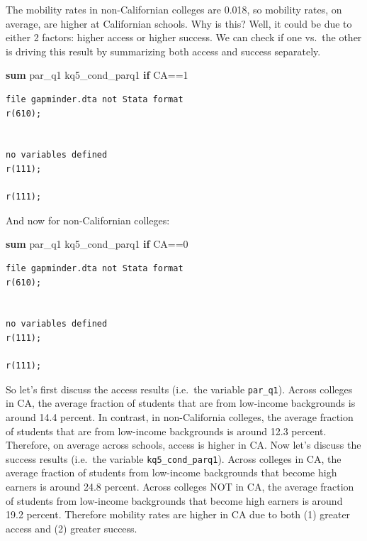 \documentclass[
]{book}
\newenvironment{Shaded}{\begin{snugshade}}{\end{snugshade}}
\newcommand{\KeywordTok}[1]{\textcolor[rgb]{0.13,0.29,0.53}{\textbf{#1}}}
\newcommand{\NormalTok}[1]{#1}
\begin{document}
The mobility rates in non-Californian colleges are 0.018, so mobility rates, on average, are higher at Californian schools. Why is this? Well, it could be due to either 2 factors: higher access or higher success. We can check if one vs.~the other is driving this result by summarizing both access and success separately.

\begin{Shaded}
\begin{Highlighting}[]
\KeywordTok{sum}\NormalTok{ par\_q1 kq5\_cond\_parq1 }\KeywordTok{if}\NormalTok{ CA==1 }
\end{Highlighting}
\end{Shaded}

\begin{verbatim}
file gapminder.dta not Stata format
r(610);


no variables defined
r(111);

r(111);
\end{verbatim}

And now for non-Californian colleges:

\begin{Shaded}
\begin{Highlighting}[]
\KeywordTok{sum}\NormalTok{ par\_q1 kq5\_cond\_parq1 }\KeywordTok{if}\NormalTok{ CA==0 }
\end{Highlighting}
\end{Shaded}

\begin{verbatim}
file gapminder.dta not Stata format
r(610);


no variables defined
r(111);

r(111);
\end{verbatim}

So let's first discuss the access results (i.e.~the variable \texttt{par\_q1}). Across colleges in CA, the average fraction of students that are from low-income backgrounds is around 14.4 percent. In contrast, in non-California colleges, the average fraction of students that are from low-income backgrounds is around 12.3 percent. Therefore, on average across schools, access is higher in CA.
Now let's discuss the success results (i.e.~the variable \texttt{kq5\_cond\_parq1}). Across colleges in CA, the average fraction of students from low-income backgrounds that become high earners is around 24.8 percent. Across colleges NOT in CA, the average fraction of students from low-income backgrounds that become high earners is around 19.2 percent. Therefore mobility rates are higher in CA due to both (1) greater access and (2) greater success.
\end{document}
